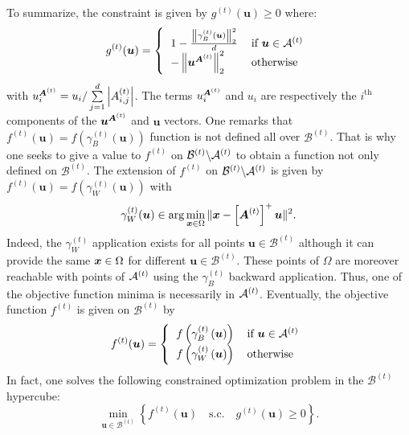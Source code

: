 To summarize, the constraint is given by $g^{(t)}(\bm{u}) \geq 0$ where:
\begin{equation}
    g^{(t)}(\bm{u}) = \left\{
    \begin{tabular}{ll}
        $1 - \frac{\left\| \gamma_B^{(t)}\left(\bm{u}\right)\right\|^2_2}{d}$ &  if $\bm{u} \in \mathcal{A}^{(t)}$\\
        $-\left\|\bm{u}^{\A^{(t)}}\right\|^2_2$ &  otherwise
    \end{tabular}
    \right.
    \label{eq:it_cst}
\end{equation}
with $u^{\bm{A}^{(t)}}_i = u_i / \sum\limits_{j=1}^d\left| A^{(t)}_{i,j} \right|$.
The terms $u^{\bm{A}^{(t)}}_i$ and $u_i$ are respectively the $i^{\text{th}}$ components of the $\bm{u}^{\bm{A}^{(t)}}$ and $\bm{u}$ vectors.
One remarks that $f^{(t)}(\bm{u}) = f\left(\gamma_B^{(t)}(\bm{u})\right)$ function is not defined all over $\mathcal{B}^{(t)}$. 
That is why one seeks to give a value to $f^{(t)}$ on $\mathcal{B}^{(t)} \backslash {\mathcal{A}}^{(t)}$ to obtain a function not only defined on $\mathcal{B}^{(t)}$.
The extension of $f^{(t)}$ on $\mathcal{B}^{(t)} \backslash {\mathcal{A}}^{(t)}$ is given by $f^{(t)}(\bm{u}) = f\left(\gamma_W^{(t)}(\bm{u})\right)$ with  
\begin{equation}
     \gamma_W^{(t)}(\bm{u}) \in \arg \min\limits_{\bm{x} \in \Omega} \| \bm{x} - \left[\bm{A}^{(t)}\right]^{+} \bm{u} \|^2.
    \label{eq:quad_prob_wang}
\end{equation}
Indeed, the $\gamma_W^{(t)}$ application exists for all points $\bm{u} \in \mathcal{B}^{(t)}$ although it can provide the same $\bm{x} \in \Omega$ for different $\bm{u} \in \mathcal{B}^{(t)}$.
These points of $\Omega$ are moreover reachable with points of ${\mathcal{A}}^{(t)}$ using the $\gamma_B^{(t)}$ backward application.
Thus, one of the objective function minima is necessarily in ${\mathcal{A}}^{(t)}$.
Eventually, the objective function $f^{(t)}$ is given on $\mathcal{B}^{(t)}$ by 
\begin{equation}
    f^{(t)}(\bm{u}) = \left\{
    \begin{tabular}{ll}
        $f\left(\gamma_B^{(t)}\left(\bm{u}\right)\right)$    &  if $\bm{u} \in \mathcal{A}^{(t)}$\\
        $f\left(\gamma_W^{(t)}\left(\bm{u}\right)\right)$  &  otherwise
    \end{tabular}
    \right.
    \label{eq:it_obj}
\end{equation}
In fact, one solves the following constrained optimization problem in the $\mathcal{B}^{(t)}$ hypercube:
\begin{equation}
    \min\limits_{\bm{u} \in \mathcal{B}^{(t)}} \left\{ f^{(t)}(\bm{u}) \quad \text{s.c.} \quad g^{(t)}(\bm{u}) \geq 0 \right\}.
    \label{eq:it_pb}
\end{equation}
